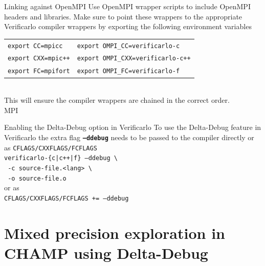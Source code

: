 \documentclass[aspectratio=169]{beamer}
\newcommand{\tabitem}{\hspace{2ex}\llap{\scriptsize{$\blacksquare$}}\hspace{1ex}}
\begin{document}
    \begin{frame}{Linking against OpenMPI}
      Use OpenMPI wrapper scripts to include OpenMPI headers and libraries. Make sure to point these wrappers to the appropriate Verificarlo compiler wrappers by exporting the following environment variables    \vspace{1em}\\
      \begin{tabular}{ll}
        \tabitem\texttt{export CC=mpicc} & \tabitem\texttt{export OMPI\_CC=verificarlo-c} \\
        \tabitem\texttt{export CXX=mpic++} & \tabitem\texttt{export OMPI\_CXX=verificarlo-c++} \\
        \tabitem\texttt{export FC=mpifort} & \tabitem\texttt{export OMPI\_FC=verificarlo-f}
      \end{tabular}\vspace{1em}\\
      This will ensure the compiler wrappers are chained in the correct order.\\
      
      \vspace{1em}
      MPI
    \end{frame}
      
    \begin{frame}{Enabling the Delta-Debug option in Verificarlo}
      To use the Delta-Debug feature in Verificarlo the extra flag \textbf{\texttt{--ddebug}} needs to be passed to the compiler directly or as \texttt{CFLAGS/CXXFLAGS/FCFLAGS}\vspace{1em}\\
      \texttt{verificarlo-\{c|c++|f\} --ddebug \textbackslash}\\
      \texttt{  -c source-file.<lang> \textbackslash}\\
      \texttt{  -o source-file.o}\vspace{1em}\\
      or as\vspace{1em}\\
      \texttt{CFLAGS/CXXFLAGS/FCFLAGS += --ddebug}
          
    \end{frame}
    
    \section{Mixed precision exploration in CHAMP using Delta-Debug}
    
\end{document}
